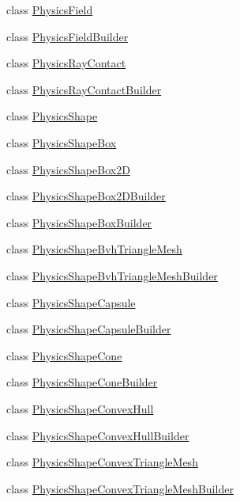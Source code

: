 \begin{DoxyCompactItemize}
\item 
class \mbox{\hyperlink{classnjli_1_1_physics_field}{Physics\+Field}}
\item 
class \mbox{\hyperlink{classnjli_1_1_physics_field_builder}{Physics\+Field\+Builder}}
\item 
class \mbox{\hyperlink{classnjli_1_1_physics_ray_contact}{Physics\+Ray\+Contact}}
\item 
class \mbox{\hyperlink{classnjli_1_1_physics_ray_contact_builder}{Physics\+Ray\+Contact\+Builder}}
\item 
class \mbox{\hyperlink{classnjli_1_1_physics_shape}{Physics\+Shape}}
\item 
class \mbox{\hyperlink{classnjli_1_1_physics_shape_box}{Physics\+Shape\+Box}}
\item 
class \mbox{\hyperlink{classnjli_1_1_physics_shape_box2_d}{Physics\+Shape\+Box2D}}
\item 
class \mbox{\hyperlink{classnjli_1_1_physics_shape_box2_d_builder}{Physics\+Shape\+Box2\+D\+Builder}}
\item 
class \mbox{\hyperlink{classnjli_1_1_physics_shape_box_builder}{Physics\+Shape\+Box\+Builder}}
\item 
class \mbox{\hyperlink{classnjli_1_1_physics_shape_bvh_triangle_mesh}{Physics\+Shape\+Bvh\+Triangle\+Mesh}}
\item 
class \mbox{\hyperlink{classnjli_1_1_physics_shape_bvh_triangle_mesh_builder}{Physics\+Shape\+Bvh\+Triangle\+Mesh\+Builder}}
\item 
class \mbox{\hyperlink{classnjli_1_1_physics_shape_capsule}{Physics\+Shape\+Capsule}}
\item 
class \mbox{\hyperlink{classnjli_1_1_physics_shape_capsule_builder}{Physics\+Shape\+Capsule\+Builder}}
\item 
class \mbox{\hyperlink{classnjli_1_1_physics_shape_cone}{Physics\+Shape\+Cone}}
\item 
class \mbox{\hyperlink{classnjli_1_1_physics_shape_cone_builder}{Physics\+Shape\+Cone\+Builder}}
\item 
class \mbox{\hyperlink{classnjli_1_1_physics_shape_convex_hull}{Physics\+Shape\+Convex\+Hull}}
\item 
class \mbox{\hyperlink{classnjli_1_1_physics_shape_convex_hull_builder}{Physics\+Shape\+Convex\+Hull\+Builder}}
\item 
class \mbox{\hyperlink{classnjli_1_1_physics_shape_convex_triangle_mesh}{Physics\+Shape\+Convex\+Triangle\+Mesh}}
\item 
class \mbox{\hyperlink{classnjli_1_1_physics_shape_convex_triangle_mesh_builder}{Physics\+Shape\+Convex\+Triangle\+Mesh\+Builder}}

\end{DoxyCompactItemize}

